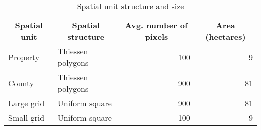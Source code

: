 \begin{table}[H]

\caption{\label{tab:res}Spatial unit structure and size}
\centering
\fontsize{9.5}{11.5}\selectfont
\begin{tabular}[t]{llrr}
\toprule
\multicolumn{1}{c}{\textbf{Spatial unit}} & \multicolumn{1}{c}{\textbf{Spatial structure}} & \multicolumn{1}{c}{\textbf{Avg. number of pixels}} & \multicolumn{1}{c}{\textbf{Area (hectares)}} \\
\cmidrule(l{3pt}r{3pt}){1-1} \cmidrule(l{3pt}r{3pt}){2-2} \cmidrule(l{3pt}r{3pt}){3-3} \cmidrule(l{3pt}r{3pt}){4-4}
Property & Thiessen polygons & 100 & 9\\
County & Thiessen polygons & 900 & 81\\
Large grid & Uniform square & 900 & 81\\
Small grid & Uniform square & 100 & 9\\
\bottomrule
\end{tabular}
\end{table}
